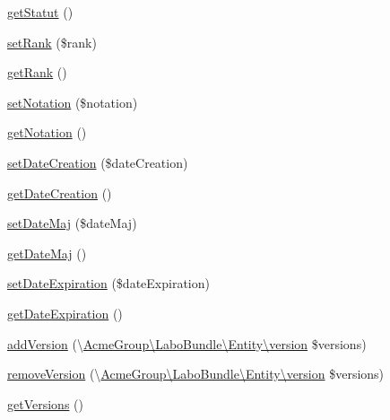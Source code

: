 \begin{DoxyCompactItemize}
\hyperlink{class_acme_group_1_1_labo_bundle_1_1_entity_1_1video_ae94dbd9d3615c49932fd8d2ff10bb8ca}{get\+Statut} ()
\item 
\hyperlink{class_acme_group_1_1_labo_bundle_1_1_entity_1_1video_a2dc5cd74e79993e43113337780119f81}{set\+Rank} (\$rank)
\item 
\hyperlink{class_acme_group_1_1_labo_bundle_1_1_entity_1_1video_aa5df961f38798277a40be642575fc8f2}{get\+Rank} ()
\item 
\hyperlink{class_acme_group_1_1_labo_bundle_1_1_entity_1_1video_aa36c38d2df418174a55d6a4a33a52c15}{set\+Notation} (\$notation)
\item 
\hyperlink{class_acme_group_1_1_labo_bundle_1_1_entity_1_1video_a619a53bc448c9614b5d8baac2c8d5118}{get\+Notation} ()
\item 
\hyperlink{class_acme_group_1_1_labo_bundle_1_1_entity_1_1video_a500d6c1621cfbfbe6b065cce342c091c}{set\+Date\+Creation} (\$date\+Creation)
\item 
\hyperlink{class_acme_group_1_1_labo_bundle_1_1_entity_1_1video_a27cc8a65ea109c8a04e08e8c166e2fbf}{get\+Date\+Creation} ()
\item 
\hyperlink{class_acme_group_1_1_labo_bundle_1_1_entity_1_1video_ae9c86d139c8f3106cc1fa4cca0f22d51}{set\+Date\+Maj} (\$date\+Maj)
\item 
\hyperlink{class_acme_group_1_1_labo_bundle_1_1_entity_1_1video_af2946186bef5269ce9f837eb128e2819}{get\+Date\+Maj} ()
\item 
\hyperlink{class_acme_group_1_1_labo_bundle_1_1_entity_1_1video_a192703b1a90ee4c2809c000650740e4f}{set\+Date\+Expiration} (\$date\+Expiration)
\item 
\hyperlink{class_acme_group_1_1_labo_bundle_1_1_entity_1_1video_a494950572fe3e304229d4588fcc3e371}{get\+Date\+Expiration} ()
\item 
\hyperlink{class_acme_group_1_1_labo_bundle_1_1_entity_1_1video_ad8a01701e1a703d4a0cfab7b7b6f08ed}{add\+Version} (\textbackslash{}\hyperlink{class_acme_group_1_1_labo_bundle_1_1_entity_1_1version}{Acme\+Group\textbackslash{}\+Labo\+Bundle\textbackslash{}\+Entity\textbackslash{}version} \$versions)
\item 
\hyperlink{class_acme_group_1_1_labo_bundle_1_1_entity_1_1video_a04f71b8753228a45f72146885e27ce82}{remove\+Version} (\textbackslash{}\hyperlink{class_acme_group_1_1_labo_bundle_1_1_entity_1_1version}{Acme\+Group\textbackslash{}\+Labo\+Bundle\textbackslash{}\+Entity\textbackslash{}version} \$versions)
\item 
\hyperlink{class_acme_group_1_1_labo_bundle_1_1_entity_1_1video_a3decc7c47c74008091e5b83ab1627dcf}{get\+Versions} ()

\end{DoxyCompactItemize}
